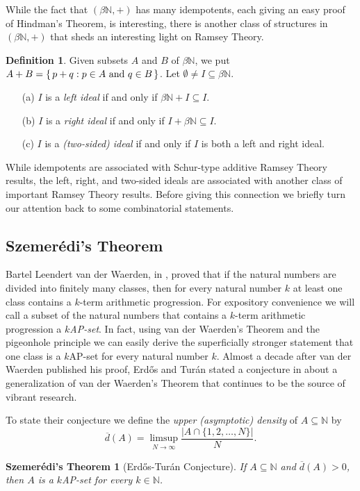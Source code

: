 \documentclass[12pt]{article}
\theoremstyle{plain}
\newtheorem{sz}[thm]{Szemer\'{e}di's Theorem}
\theoremstyle{definition}
\newtheorem{defn}[thm]{Definition}
\newcommand{\bbN}{\mathbb{N}}
\begin{document}
While the fact that $(\beta\bbN, +)$ has many idempotents, each giving
an easy proof of Hindman's Theorem, is interesting, there is another
class of structures in $(\beta\bbN, +)$ that sheds an interesting
light on Ramsey Theory. 

\begin{defn}
  Given subsets $A$ and $B$ of $\beta\bbN$, we put $A + B = \{\, p+q :
  \hbox{$p \in A$ and $q \in B$} \,\}$.
  Let $\emptyset \ne I \subseteq \beta\bbN$.
    \begin{itemize}
      \item[(a)] $I$ is a \textsl{left ideal} if and only if
        $\beta\bbN + I \subseteq I$.
      \item[(b)] $I$ is a \textsl{right ideal} if and only if
        $I+\beta\bbN \subseteq I$.
      \item[(c)] $I$ is a \textsl{(two-sided) ideal} if and only if
        $I$ is both a left and right ideal.
    \end{itemize}
\end{defn}

While idempotents are associated with Schur-type additive Ramsey
Theory results, the left, right, and two-sided ideals are associated
with another class of important Ramsey Theory results. 
Before giving this connection we briefly turn our attention back to
some combinatorial statements.

\subsection{Szemer\'{e}di's Theorem}
Bartel Leendert van der Waerden, in \cite{Van-der-Waerden:1927fk},
proved that if the natural numbers are divided into finitely many
classes, then for every natural number $k$ at least one class contains
a $k$-term arithmetic progression. 
For expository convenience we will call a subset of the natural
numbers that contains a $k$-term arithmetic progression a
\textsl{$k$AP-set}.
In fact, using van der Waerden's Theorem and the pigeonhole principle
we can easily derive the superficially stronger statement that one
class is a $k$AP-set for every natural number $k$.
Almost a decade after van der Waerden published his proof, Erd\H{o}s
and Tur\'{a}n stated a conjecture in \cite{Erdos:1936fk} about a
generalization of van der Waerden's Theorem that continues to be the
source of vibrant research.

To state their conjecture we define the \textsl{upper (asymptotic)
  density} of $A \subseteq \bbN$ by 
  \[
    \overline{d}(A) = \limsup_{N\to\infty} \frac{|A \cap \{1, 2,
      \ldots, N\}|}{N}.
  \]
  \begin{sz}[Erd\H{o}s-Tur\'{a}n Conjecture]
    \label{sz:upperdensity}
    If $A \subseteq \bbN$ and $\overline{d}(A) > 0$, then $A$ is a
    $k$AP-set for every $k \in \bbN$.
  \end{sz}
\end{document}
